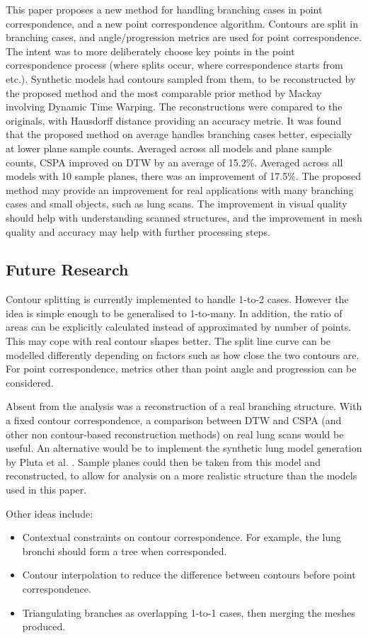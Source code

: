 \documentclass[11p, titlepage]{article}
\begin{document}
This paper proposes a new method for handling branching cases in point correspondence, and a new point correspondence algorithm. Contours are split in branching cases, and angle/progression metrics are used for point correspondence. The intent was to more deliberately choose key points in the point correspondence process (where splits occur, where correspondence starts from etc.). Synthetic models had contours sampled from them, to be reconstructed by the proposed method and the most comparable prior method by Mackay involving Dynamic Time Warping. The reconstructions were compared to the originals, with Hausdorff distance providing an accuracy metric. It was found that the proposed method on average handles branching cases better, especially at lower plane sample counts. Averaged across all models and plane sample counts, CSPA improved on DTW by an average of 15.2\%. Averaged across all models with 10 sample planes, there was an improvement of 17.5\%. The proposed method may provide an improvement for real applications with many branching cases and small objects, such as lung scans. The improvement in visual quality should help with understanding scanned structures, and the improvement in mesh quality and accuracy may help with further processing steps.

\subsection{Future Research}

Contour splitting is currently implemented to handle 1-to-2 cases. However the idea is simple enough to be generalised to 1-to-many. In addition, the ratio of areas can be explicitly calculated instead of approximated by number of points. This may cope with real contour shapes better. The split line curve can be modelled differently depending on factors such as how close the two contours are. For point correspondence, metrics other than point angle and progression can be considered.

Absent from the analysis was a reconstruction of a real branching structure. With a fixed contour correspondence, a comparison between DTW and CSPA (and other non contour-based reconstruction methods) on real lung scans would be useful. An alternative would be to implement the synthetic lung model generation by Pluta et al. \cite{pluta2012new}. Sample planes could then be taken from this model and reconstructed, to allow for analysis on a more realistic structure than the models used in this paper.

Other ideas include:
\begin{itemize}
\item Contextual constraints on contour correspondence. For example, the lung bronchi should form a tree when corresponded.
\item Contour interpolation to reduce the difference between contours before point correspondence.
\item Triangulating branches as overlapping 1-to-1 cases, then merging the meshes produced.
\end{itemize}

\pagebreak


\end{document}
